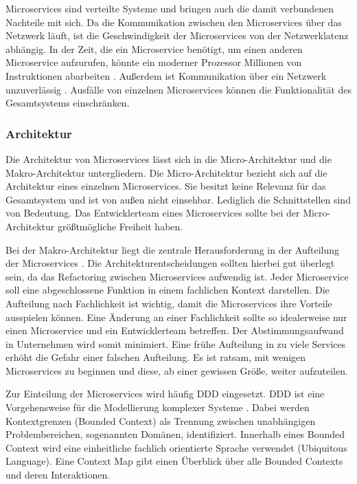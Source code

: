 Microservices sind verteilte Systeme und bringen auch die damit verbundenen Nachteile mit sich. Da die Kommunikation zwischen den Microservices über das Netzwerk läuft, ist die Geschwindigkeit der Microservices von der Netzwerklatenz abhängig. In der Zeit, die ein Microservice benötigt, um einen anderen Microservice aufzurufen, könnte ein moderner Prozessor Millionen von Instruktionen abarbeiten \parencite[vgl.][S. 73]{wolffMicroservices2018}. Außerdem ist Kommunikation über ein Netzwerk unzuverlässig \parencite[vgl.][S. 76]{wolffMicroservices2018}. Ausfälle von einzelnen Microservices können die Funktionalität des Gesamtsystems einschränken.

\subsubsection{Architektur}

Die Architektur von Microservices lässt sich in die Micro-Architektur und die Makro-Architektur untergliedern. Die Micro-Architektur bezieht sich auf die Architektur eines einzelnen Microservices. Sie besitzt keine Relevanz für das Gesamtsystem und ist von außen nicht einsehbar. Lediglich die Schnittstellen sind von Bedeutung. Das Entwicklerteam eines Microservices sollte bei der Micro-Architektur größtmögliche Freiheit haben.

Bei der Makro-Architektur liegt die zentrale Herausforderung in der Aufteilung der Microservices \parencite[vgl.][S. 102]{wolffMicroservices2018}. Die Architekturentscheidungen sollten hierbei gut überlegt sein, da das Refactoring zwischen Microservices aufwendig ist. Jeder Microservice soll eine abgeschlossene Funktion in einem fachlichen Kontext darstellen. Die Aufteilung nach Fachlichkeit ist wichtig, damit die Microservices ihre Vorteile ausspielen können. Eine Änderung an einer Fachlichkeit sollte so idealerweise nur einen Microservice und ein Entwicklerteam betreffen. Der Abstimmungsaufwand in Unternehmen wird somit minimiert. Eine frühe Aufteilung in zu viele Services erhöht die Gefahr einer falschen Aufteilung. Es ist ratsam, mit wenigen Microservices zu beginnen und diese, ab einer gewissen Größe, weiter aufzuteilen.

Zur Einteilung der Microservices wird häufig \ac{DDD} eingesetzt. \ac{DDD} ist eine Vorgehensweise für die Modellierung komplexer Systeme \parencite[vgl.][S. 66]{evansDomainDriven2015}. Dabei werden Kontextgrenzen (Bounded Context) als Trennung zwischen unabhängigen Problembereichen, sogenannten Domänen, identifiziert. Innerhalb eines Bounded Context wird eine einheitliche fachlich orientierte Sprache verwendet  (Ubiquitous Language). Eine Context Map gibt einen Überblick über alle Bounded Contexts und deren Interaktionen.

